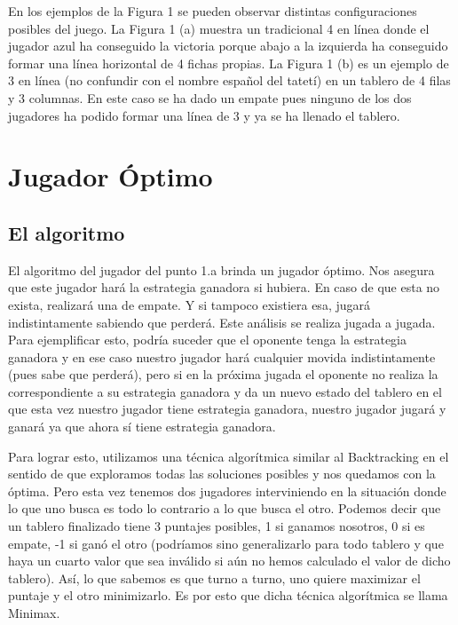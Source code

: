 \documentclass[A4paper,oneside,fleqn,11pt]{article}
\theoremstyle{definition}
\begin{document}
En los ejemplos de la Figura 1 se pueden observar distintas configuraciones posibles del juego. La Figura 1 (a) muestra un tradicional 4 en línea donde el jugador azul ha conseguido la victoria porque abajo a la izquierda ha conseguido formar una línea horizontal de 4 fichas propias. La Figura 1 (b) es un ejemplo de 3 en línea (no confundir con el nombre español del tatetí) en un tablero de 4 filas y 3 columnas. En este caso se ha dado un empate pues ninguno de los dos jugadores ha podido formar una línea de 3 y ya se ha llenado el tablero.


\section{Jugador Óptimo}

\subsection{El algoritmo}

El algoritmo del jugador del punto 1.a brinda un jugador óptimo. Nos asegura que este jugador hará la estrategia ganadora si hubiera. En caso de que esta no exista, realizará una de empate. Y si tampoco existiera esa, jugará indistintamente sabiendo que perderá. Este análisis se realiza jugada a jugada. Para ejemplificar esto, podría suceder que el oponente tenga la estrategia ganadora y en ese caso nuestro jugador hará cualquier movida indistintamente (pues sabe que perderá), pero si en la próxima jugada el oponente no realiza la correspondiente a su estrategia ganadora y da un nuevo estado del tablero en el que esta vez nuestro jugador tiene estrategia ganadora, nuestro jugador jugará y ganará ya que ahora sí tiene estrategia ganadora.

Para lograr esto, utilizamos una técnica algorítmica similar al Backtracking en el sentido de que exploramos todas las soluciones posibles y nos quedamos con la óptima. Pero esta vez tenemos dos jugadores interviniendo en la situación donde lo que uno busca es todo lo contrario a lo que busca el otro. Podemos decir que un tablero finalizado tiene 3 puntajes posibles, 1 si ganamos nosotros, 0 si es empate, -1 si ganó el otro (podríamos sino generalizarlo para todo tablero y que haya un cuarto valor que sea inválido si aún no hemos calculado el valor de dicho tablero). Así, lo que sabemos es que turno a turno, uno quiere maximizar el puntaje y el otro minimizarlo. Es por esto que dicha técnica algorítmica se llama Minimax. 
\end{document}

